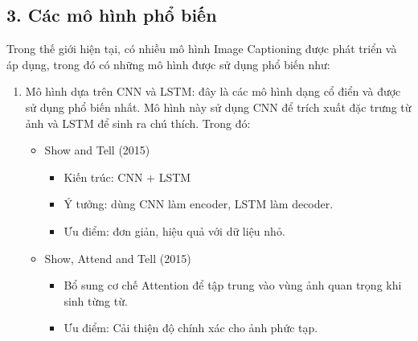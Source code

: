 \documentclass[../main.tex]{subfiles}
\begin{document}
\subsection*{3. Các mô hình phổ biến}

Trong thế giới hiện tại, có nhiều mô hình Image Captioning được phát triển và áp dụng, trong đó có những mô hình được sử dụng phổ biến như:

\begin{enumerate}
    \item Mô hình dựa trên CNN và LSTM: đây là các mô hình dạng cổ điển và được sử dụng phổ biến nhất. Mô hình này sử dụng CNN để trích xuất đặc trưng từ ảnh và LSTM để sinh ra chú thích. Trong đó:
    \begin{itemize}
        \item Show and Tell (2015)
        \begin{itemize}
            \item Kiến trúc: CNN + LSTM
            \item Ý tưởng: dùng CNN làm encoder, LSTM làm decoder.
            \item Ưu điểm: đơn giản, hiệu quả với dữ liệu nhỏ.
        \end{itemize}

        \item Show, Attend and Tell (2015)
        \begin{itemize}
            \item Bổ sung cơ chế Attention để tập trung vào vùng ảnh quan trọng khi sinh từng từ.
            \item Ưu điểm: Cải thiện độ chính xác cho ảnh phức tạp.
        \end{itemize}


\end{itemize}
\end{enumerate}
\end{document}

